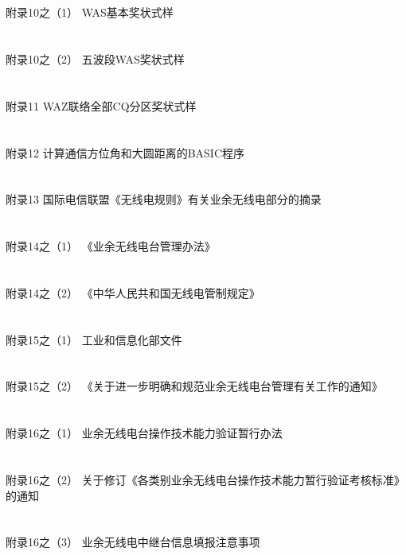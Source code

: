 \documentclass[12pt,UTF8]{ctexbook}
\begin{document}
\section{}附录10之（1） WAS基本奖状式样
\section{}附录10之（2） 五波段WAS奖状式样
\section{}附录11 WAZ联络全部CQ分区奖状式样
\section{}附录12 计算通信方位角和大圆距离的BASIC程序
\section{}附录13 国际电信联盟《无线电规则》有关业余无线电部分的摘录
\section{}附录14之（1） 《业余无线电台管理办法》
\section{}附录14之（2） 《中华人民共和国无线电管制规定》
\section{}附录15之（1） 工业和信息化部文件
\section{}附录15之（2） 《关于进一步明确和规范业余无线电台管理有关工作的通知》
\section{}附录16之（1） 业余无线电台操作技术能力验证暂行办法
\section{}附录16之（2） 关于修订《各类别业余无线电台操作技术能力暂行验证考核标准》的通知
\section{}附录16之（3） 业余无线电中继台信息填报注意事项
\end{document}

